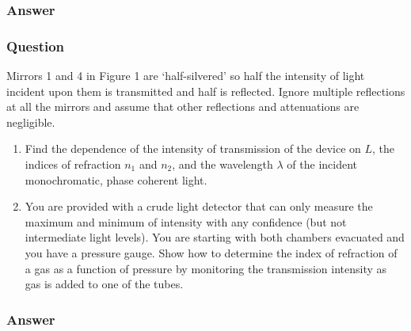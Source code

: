 \subsubsection{Answer}



\subsubsection{Question}
Mirrors 1 and 4 in Figure 1 are `half-silvered' so half the intensity of light incident upon them is transmitted and half is reflected. Ignore multiple reflections at all the mirrors and assume that other reflections and attenuations are negligible.
\begin{enumerate}
	\item Find the dependence of the intensity of transmission of the device on $L$, the indices of refraction $n_1$ and $n_2$, and the wavelength $\lambda$ of the incident monochromatic, phase coherent light.
	\item You are provided with a crude light detector that can only measure the maximum and minimum of intensity with any confidence (but not intermediate light levels). You are starting with both chambers evacuated and you have a pressure gauge. Show how to determine the index of refraction of a gas as a function of pressure by monitoring the transmission intensity as gas is added to one of the tubes.
\end{enumerate}
\subsubsection{Answer}

